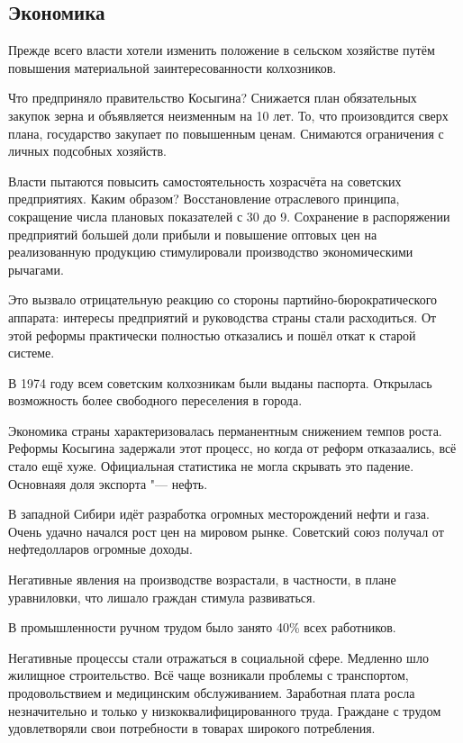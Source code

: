 \documentclass{article}
\begin{document}
\subsection{Экономика}
Прежде всего власти хотели изменить положение в сельском хозяйстве путём повышения материальной заинтересованности колхозников.

Что предприняло правительство Косыгина? Снижается план обязательных закупок зерна и объявляется неизменным на 10 лет. То, что произовдится сверх плана, государство закупает по повышенным ценам. Снимаются ограничения с личных подсобных хозяйств.

Власти пытаются повысить самостоятельность хозрасчёта на советских предприятиях. Каким образом? Восстановление отраслевого принципа, сокращение числа плановых показателей с 30 до 9. Сохранение в распоряжении предприятий большей доли прибыли и повышение оптовых цен на реализованную продукцию стимулировали производство экономическими рычагами.

Это вызвало отрицательную реакцию со стороны партийно-бюрократического аппарата: интересы предприятий и руководства страны стали расходиться. От этой реформы практически полностью отказались и пошёл откат к старой системе.

В 1974 году всем советским колхозникам были выданы паспорта. Открылась возможность более свободного переселения в города.

Экономика страны характеризовалась перманентным снижением темпов роста. Реформы Косыгина задержали этот процесс, но когда от реформ отказаались, всё стало ещё хуже. Официальная статистика не могла скрывать это падение. Основнаяя доля экспорта "--- нефть.

В западной Сибири идёт разработка огромных месторождений нефти и газа. Очень удачно начался рост цен на мировом рынке. Советский союз получал от нефтедолларов огромные доходы.

Негативные явления на производстве возрастали, в частности, в плане уравниловки, что лишало граждан стимула развиваться.

В промышленности ручном трудом было занято 40\% всех работников. 

Негативные процессы стали отражаться в социальной сфере. Медленно шло жилищное строительство. Всё чаще возникали проблемы с транспортом, продовольствием и медицинским обслуживанием. Заработная плата росла незначительно и только у низкоквалифицированного труда. Граждане с трудом удовлетворяли свои потребности в товарах широкого потребления.
\end{document}
